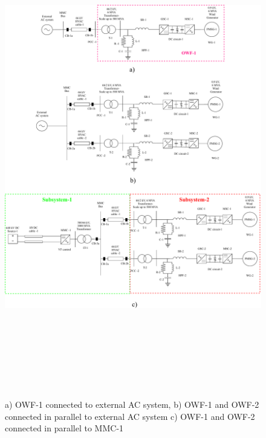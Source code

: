 





\begin{figure}[H]
    \includegraphics[height = 21cm,width = \textwidth]{Diagrams/Chapter_4/Steps_for_Scaling.pdf}
    \caption{a) OWF-1 connected to external AC system, b) OWF-1 and OWF-2 connected in parallel to external AC system c) OWF-1 and OWF-2 connected in parallel to MMC-1}
    \label{fig:Steps_for_Scaling}
\end{figure}

